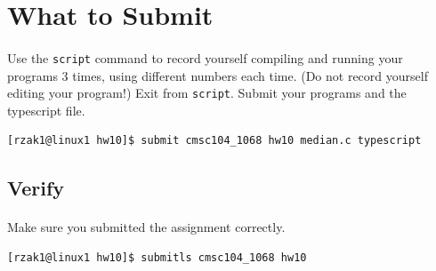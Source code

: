 \documentclass[letter,11pt]{article}
\begin{document}
\section*{What to Submit}
\paragraph{}Use the \texttt{script} command to record yourself compiling and running your programs 3 times, using different numbers each time. (Do not record yourself editing your program!) Exit from \texttt{script}. Submit your programs and the typescript file.

\begin{verbatim}
[rzak1@linux1 hw10]$ submit cmsc104_1068 hw10 median.c typescript
\end{verbatim}

\subsection*{Verify}
\paragraph{}Make sure you submitted the assignment correctly.
\begin{verbatim}
[rzak1@linux1 hw10]$ submitls cmsc104_1068 hw10
\end{verbatim}
\end{document}
